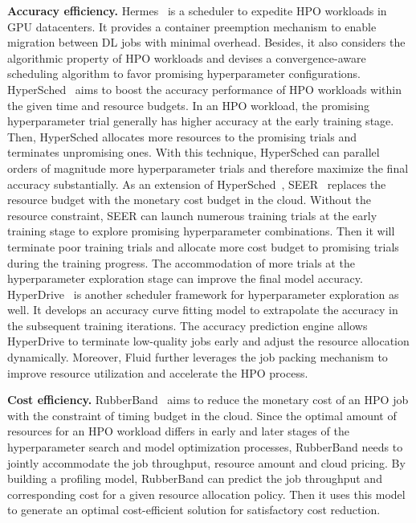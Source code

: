 \textbf{Accuracy efficiency.}
Hermes~\cite{Hermes} is a scheduler to expedite HPO workloads in GPU datacenters. It provides a container preemption mechanism to enable migration between DL jobs with minimal overhead. Besides, it also considers the algorithmic property of HPO workloads and devises a convergence-aware scheduling algorithm to favor promising hyperparameter configurations.
HyperSched~\cite{HyperSched} aims to boost the accuracy performance of HPO workloads within the given time and resource budgets. In an HPO workload, the promising hyperparameter trial generally has higher accuracy at the early training stage. Then, HyperSched allocates more resources to the promising trials and terminates unpromising ones. With this technique, HyperSched can parallel orders of magnitude more hyperparameter trials and therefore maximize the final accuracy substantially. As an extension of HyperSched~\cite{HyperSched}, SEER~\cite{SEER} replaces the resource budget with the monetary cost budget in the cloud. Without the resource constraint, SEER can launch numerous training trials at the early training stage to explore promising hyperparameter combinations. Then it will terminate poor training trials and allocate more cost budget to promising trials during the training progress. The accommodation of more trials at the hyperparameter exploration stage can improve the final model accuracy. HyperDrive~\cite{HyperDrive} is another scheduler framework for hyperparameter exploration as well.
It develops an accuracy curve fitting model to extrapolate the accuracy in the subsequent training iterations. The accuracy prediction engine allows HyperDrive to terminate low-quality jobs early and adjust the resource allocation dynamically. Moreover, Fluid \cite{Fluid} further leverages the job packing mechanism to improve resource utilization and accelerate the HPO process.


\textbf{Cost efficiency.}
RubberBand~\cite{RubberBand} aims to reduce the monetary cost of an HPO job with the constraint of timing budget in the cloud. Since the optimal amount of resources for an HPO workload differs in early and later stages of the hyperparameter search and model optimization processes, RubberBand needs to jointly accommodate the job throughput, resource amount and cloud pricing. By building a profiling model, RubberBand can predict the job throughput and corresponding cost for a given resource allocation policy. Then it uses this model to generate an optimal cost-efficient solution for satisfactory cost reduction.

